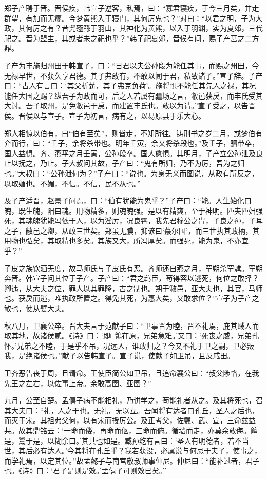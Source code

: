 \documentclass[]{article}
\begin{document}
郑子产聘于晋。晋侯疾，韩宣子逆客，私焉，曰：``寡君寝疾，于今三月矣，并走群望，有加而无瘳。今梦黄熊入于寝门，其何厉鬼也？''对曰：``以君之明，子为大政，其何厉之有？昔尧殛鲧于羽山，其神化为黄熊，以入于羽渊，实为夏郊，三代祀之。晋为盟主，其或者未之祀也乎？''韩子祀夏郊，晋侯有间，赐子产莒之二方鼎。

子产为丰施归州田于韩宣子，曰：``日君以夫公孙段为能任其事，而赐之州田，今无禄早世，不获久享君德。其子弗敢有，不敢以闻于君，私致诸子。''宣子辞。子产曰：``古人有言曰：`其父析薪，其子弗克负荷'。施将惧不能任其先人之禄，其况能任大国之赐？纵吾子为政而可，后之人若属有疆场之言，敝邑获戾，而丰氏受其大讨。吾子取州，是免敝邑于戾，而建置丰氏也。敢以为请。''宣子受之，以告晋侯。晋侯以与宣子。宣子为初言，病有之，以易原县于乐大心。

郑人相惊以伯有，曰``伯有至矣''，则皆走，不知所往。铸刑书之岁二月，或梦伯有介而行，曰：``壬子，余将杀带也。明年壬寅，余又将杀段也。''及壬子，驷带卒，国人益惧。齐、燕平之月壬寅，公孙段卒。国人愈惧。其明月，子产立公孙泄及良止以抚之，乃止。子大叔问其故，子产曰：``鬼有所归，乃不为厉，吾为之归也。''大叔曰：``公孙泄何为？''子产曰：``说也。为身无义而图说，从政有所反之，以取媚也。不媚，不信。不信，民不从也。''

及子产适晋，赵景子问焉，曰：``伯有犹能为鬼乎？''子产曰：``能。人生始化曰魄，既生魄，阳曰魂。用物精多，则魂魄强。是以有精爽，至于神明。匹夫匹妇强死，其魂魄犹能冯依于人，以为淫厉，况良霄，我先君穆公之胄，子良之孙，子耳之子，敝邑之卿，从政三世矣。郑虽无腆，抑谚曰`蕞尔国'，而三世执其政柄，其用物也弘矣，其取精也多矣。其族又大，所冯厚矣。而强死，能为鬼，不亦宜乎？''

子皮之族饮酒无度，故马师氏与子皮氏有恶。齐师还自燕之月，罕朔杀罕魋。罕朔奔晋。韩宣子问其位于子产。子产曰：``君之羁臣，苟得容以逃死，何位之敢择？卿违，从大夫之位，罪人以其罪降，古之制也。朔于敝邑，亚大夫也，其官，马师也。获戾而逃，唯执政所置之。得免其死，为惠大矣，又敢求位？''宣子为子产之敏也，使从嬖大夫。

秋八月，卫襄公卒。晋大夫言于范献子曰：``卫事晋为睦，晋不礼焉，庇其贼人而取其地，故诸侯贰。《诗》曰：`即□鴒在原，兄弟急难。'又曰：`死丧之威，兄弟孔怀。'兄弟之不睦，于是乎不吊，况远人，谁敢归之？今又不礼于卫之嗣，卫必叛我，是绝诸侯也。''献子以告韩宣子。宣子说，使献子如卫吊，且反戚田。

卫齐恶告丧于周，且请命。王使臣简公如卫吊，且追命襄公曰：``叔父陟恪，在我先王之左右，以佐事上帝。余敢高圉、亚圉？''

九月，公至自楚。孟僖子病不能相礼，乃讲学之，苟能礼者从之。及其将死也，召其大夫曰：``礼，人之干也。无礼，无以立。吾闻将有达者曰孔丘，圣人之后也，而灭于宋。其祖弗父何，以有宋而授厉公。及正考父，佐戴、武、宣，三命兹益共。故其鼎铭云：`一命而偻，再命而伛，三命而俯。循墙而走，亦莫余敢侮。饘是，鬻于是，以糊余口。'其共也如是。臧孙纥有言曰：`圣人有明德者，若不当世，其后必有达人。'今其将在孔丘乎？我若获没，必属说与何忌于夫子，使事之，而学礼焉，以定其位。''故孟懿子与南宫敬叔师事仲尼。仲尼曰：``能补过者，君子也。《诗》曰：`君子是则是效。'孟僖子可则效已矣。''
\end{document}
